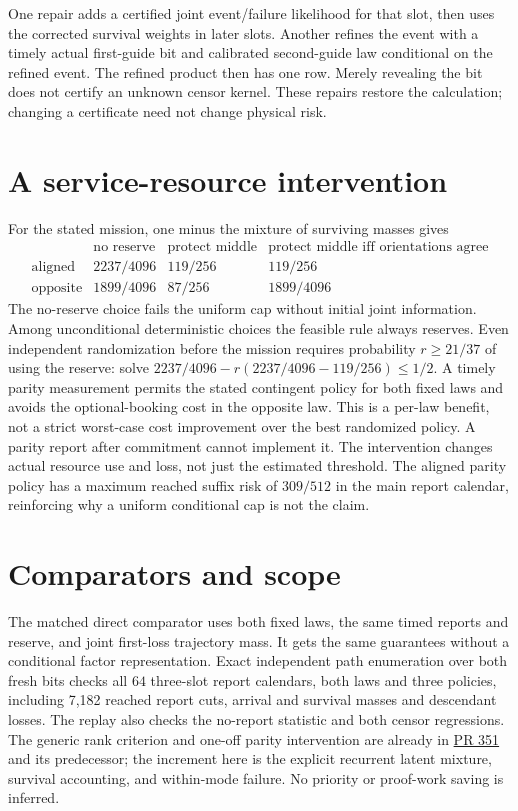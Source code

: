 \documentclass[11pt]{article}
\begin{document}
One repair adds a certified joint event/failure likelihood for that slot, then uses the corrected survival weights in later slots. Another refines the event with a timely actual first-guide bit and calibrated second-guide law conditional on the refined event. The refined product then has one row. Merely revealing the bit does not certify an unknown censor kernel. These repairs restore the calculation; changing a certificate need not change physical risk.

\section{A service-resource intervention}
For the stated mission, one minus the mixture of surviving masses gives
\[
\begin{array}{c|c|c|c}
 &\text{no reserve}&\text{protect middle}&\text{protect middle iff orientations agree}\\\hline
\text{aligned}&2237/4096&119/256&119/256\\
\text{opposite}&1899/4096&87/256&1899/4096
\end{array}
\]
The no-reserve choice fails the uniform cap without initial joint information. Among unconditional deterministic choices the feasible rule always reserves. Even independent randomization before the mission requires probability $r\ge21/37$ of using the reserve: solve
$2237/4096-r(2237/4096-119/256)\le1/2$.
A timely parity measurement permits the stated contingent policy for both fixed laws and avoids the optional-booking cost in the opposite law. This is a per-law benefit, not a strict worst-case cost improvement over the best randomized policy. A parity report after commitment cannot implement it. The intervention changes actual resource use and loss, not just the estimated threshold. The aligned parity policy has a maximum reached suffix risk of $309/512$ in the main report calendar, reinforcing why a uniform conditional cap is not the claim.

\section{Comparators and scope}
The matched direct comparator uses both fixed laws, the same timed reports and reserve, and joint first-loss trajectory mass. It gets the same guarantees without a conditional factor representation. Exact independent path enumeration over both fresh bits checks all $64$ three-slot report calendars, both laws and three policies, including 7,182 reached report cuts, arrival and survival masses and descendant losses. The replay also checks the no-report statistic and both censor regressions. The generic rank criterion and one-off parity intervention are already in \href{https://github.com/eternal-november/eos-research-programmes/pull/351}{PR 351} and its predecessor; the increment here is the explicit recurrent latent mixture, survival accounting, and within-mode failure. No priority or proof-work saving is inferred.
\end{document}
